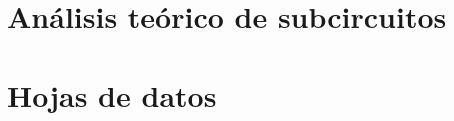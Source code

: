 \pagestyle{allpages}

\appendix


\appendixpage
\addappheadtotoc



\section{Análisis teórico de subcircuitos}

\resetallcounters


\clearpage



\clearpage



\cleardoublepage

\section{Hojas de datos}


\cleardoublepage



